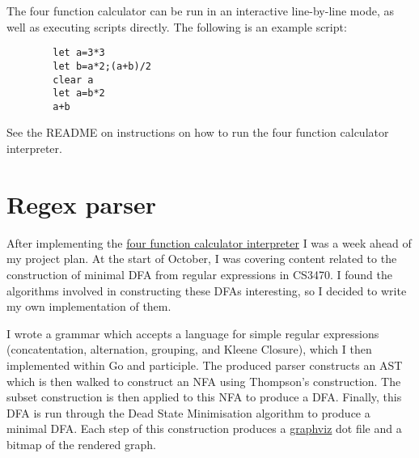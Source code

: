 The four function calculator can be run in an interactive line-by-line mode, as well as executing scripts directly. The following is an example script:

\begin{center}
    \begin{verbatim}
        let a=3*3
        let b=a*2;(a+b)/2
        clear a
        let a=b*2
        a+b
    \end{verbatim}
\end{center}

See the README on instructions on how to run the four function calculator interpreter.

\section{Regex parser}
\label{sec:regex-parser}

After implementing the \hyperref[sec:four-func-calculator]{four function calculator interpreter} I was a week ahead of my project plan. At the start of October, I was covering content related to the construction of minimal DFA from regular expressions in CS3470. I found the algorithms involved in constructing these DFAs interesting, so I decided to write my own implementation of them.

I wrote a grammar which accepts a language for simple regular expressions (concatentation, alternation, grouping, and Kleene Closure), which I then implemented within Go and participle. The produced parser constructs an AST which is then walked to construct an NFA using Thompson's construction. The subset construction is then applied to this NFA to produce a DFA. Finally, this DFA is run through the Dead State Minimisation algorithm to produce a minimal DFA. Each step of this construction produces a \href{https://graphviz.org/}{graphviz} dot file and a bitmap of the rendered graph.

